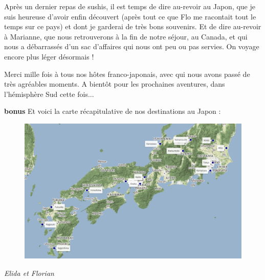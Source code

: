 Après un dernier repas de sushis, il est temps de dire au-revoir au
Japon, que je suis heureuse d'avoir enfin découvert (après tout ce que
Flo me racontait tout le temps sur ce pays) et dont je garderai de très
bons souvenirs. Et de dire au-revoir à Marianne, que nous retrouverons à
la fin de notre séjour, au Canada, et qui nous a débarrassés d'un sac
d'affaires qui nous ont peu ou pas servies. On voyage encore plus léger
désormais !

Merci mille fois à tous nos hôtes franco-japonais, avec qui nous avons
passé de très agréables moments. A bientôt pour les prochaines
aventures, dans l'hémisphère Sud cette fois...

\textbf{bonus} Et voici la carte récapitulative de nos destinations au
Japon :

\begin{figure}
\centering
\includegraphics{maps/Japon.png}
\end{figure}

\emph{Elida et Florian}
